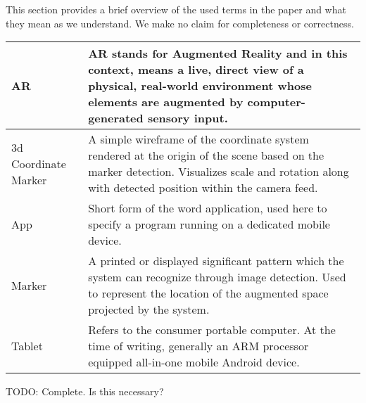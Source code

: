 This section provides a brief overview of the used terms in the paper and what they mean as we understand.
We make no claim for completeness or correctness.

\begin{tabulary}{\textwidth}{L|L}
AR & AR stands for Augmented Reality and in this context, means a live, direct view of a physical, real-world environment whose elements are augmented by computer-generated sensory input\protect \cite{ardef}. \\
\hline
3d Coordinate Marker & A simple wireframe of the coordinate system rendered at the origin of the scene based on the marker detection. Visualizes scale and rotation along with detected position within the camera feed. \\
\hline
App & Short form of the word application, used here to specify a program running on a dedicated mobile device. \\
\hline
Marker & A printed or displayed significant pattern which the system can recognize through image detection. Used to represent the location of the augmented space projected by the system. \\
\hline
Tablet & Refers to the consumer portable computer. At the time of writing, generally an ARM processor equipped all-in-one mobile Android device.\\
\end{tabulary}

TODO: Complete. Is this necessary?